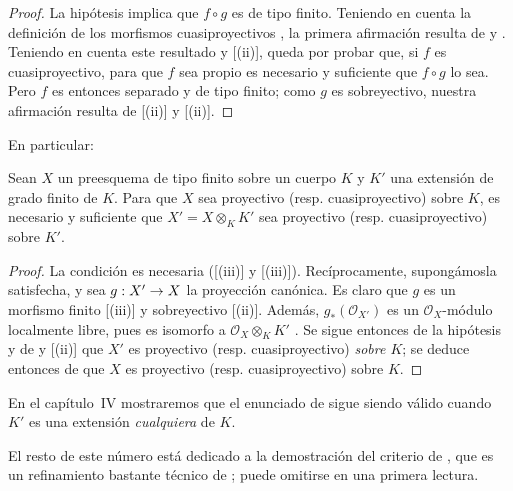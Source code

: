 \documentclass[oneside,10pt]{amsart}
\makeatletter
\newcommand{\ega@arrow}[2]{\mathchoice{#1}{#2}{#2}{#2}}
\renewcommand{\to}{\ega@arrow{\longrightarrow}{\rightarrow}}
\let\EGAOriginalLabel\label
\renewcommand{\label}[1]{\phantomsection\EGAOriginalLabel{#1}}
\makeatother
\begin{document}
\begin{proof}
La hipótesis implica que $f\circ g$ es de tipo finito.
Teniendo en cuenta la definición de los morfismos cuasiproyectivos , la primera afirmación resulta de  y .
Teniendo en cuenta este resultado y [(ii)], queda por probar que, si $f$ es cuasiproyectivo, para que $f$ sea propio es necesario y suficiente que $f\circ g$ lo sea.
Pero $f$ es entonces separado  y de tipo finito;
como $g$ es sobreyectivo, nuestra afirmación resulta de [(ii)] y [(ii)].
\end{proof}

En particular:

\begin{corollary}[6.6.5]
\label{II.6.6.5-fr}
Sean $X$ un preesquema de tipo finito sobre un cuerpo $K$ y $K'$ una extensión de grado finito de $K$.
Para que $X$ sea proyectivo \textup{(resp.} cuasiproyectivo\textup{)} sobre $K$, es necesario y suficiente que $X'=X\otimes_K K'$ sea proyectivo \textup{(resp.} cuasiproyectivo\textup{)} sobre $K'$.
\end{corollary}

\begin{proof}
La condición es necesaria ([(iii)] y [(iii)]).
Recíprocamente, supongámosla satisfecha, y sea $g:X'\to X$ la proyección canónica.
Es claro que $g$ es un morfismo finito [(iii)] y sobreyectivo [(ii)].
Además, $g_*(\mathcal{O}_{X'})$ es un $\mathcal{O}_X$-módulo localmente libre, pues es isomorfo a $\mathcal{O}_X\otimes_K K'$ .
Se sigue entonces de la hipótesis y de  y [(ii)] que $X'$ es proyectivo (resp. cuasiproyectivo) \emph{sobre $K$};
se deduce entonces de  que $X$ es proyectivo (resp. cuasiproyectivo) sobre $K$.
\end{proof}

En el capítulo~IV mostraremos que el enunciado de  sigue siendo válido cuando $K'$ es una extensión \emph{cualquiera} de $K$.

El resto de este número está dedicado a la demostración del criterio de , que es un refinamiento bastante técnico de ;
puede omitirse en una primera lectura.
\end{document}
